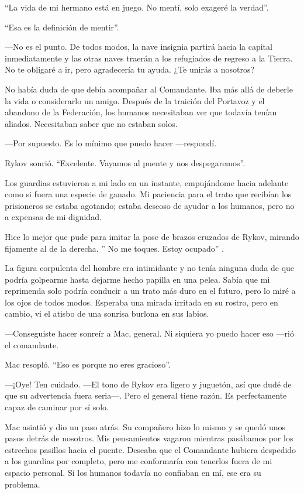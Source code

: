 ``La vida de mi hermano está en juego. No mentí, solo exageré la verdad''.

``Esa es la definición de mentir''.

—No es el punto. De todos modos, la nave insignia partirá hacia la capital inmediatamente y las otras naves traerán a los refugiados de regreso a la Tierra. No te obligaré a ir, pero agradecería tu ayuda. ¿Te unirás a nosotros?

No había duda de que debía acompañar al Comandante. Iba más allá de deberle la vida o considerarlo un amigo. Después de la traición del Portavoz y el abandono de la Federación, los humanos necesitaban ver que todavía tenían aliados. Necesitaban saber que no estaban solos.

—Por supuesto. Es lo mínimo que puedo hacer —respondí.

Rykov sonrió. ``Excelente. Vayamos al puente y nos despegaremos''.

Los guardias estuvieron a mi lado en un instante, empujándome hacia adelante como si fuera una especie de ganado. Mi paciencia para el trato que recibían los prisioneros se estaba agotando; estaba deseoso de ayudar a los humanos, pero no a expensas de mi dignidad.

Hice lo mejor que pude para imitar la pose de brazos cruzados de Rykov, mirando fijamente al de la derecha. ''
No me toques. Estoy ocupado''
.

La figura corpulenta del hombre era intimidante y no tenía ninguna duda de que podría golpearme hasta dejarme hecho papilla en una pelea. Sabía que mi reprimenda solo podría conducir a un trato más duro en el futuro, pero lo miré a los ojos de todos modos. Esperaba una mirada irritada en su rostro, pero en cambio, vi el atisbo de una sonrisa burlona en sus labios.

—Conseguiste hacer sonreír a Mac, general. Ni siquiera yo puedo hacer eso —rió el comandante.

Mac resopló. ``Eso es porque no eres gracioso''.

—¡Oye! Ten cuidado. —El tono de Rykov era ligero y juguetón, así que dudé de que su advertencia fuera seria—. Pero el general tiene razón. Es perfectamente capaz de caminar por sí solo.

Mac asintió y dio un paso atrás. Su compañero hizo lo mismo y se quedó unos pasos detrás de nosotros. Mis pensamientos vagaron mientras pasábamos por los estrechos pasillos hacia el puente. Deseaba que el Comandante hubiera despedido a los guardias por completo, pero me conformaría con tenerlos fuera de mi espacio personal. Si los humanos todavía no confiaban en mí, ese era su problema.

